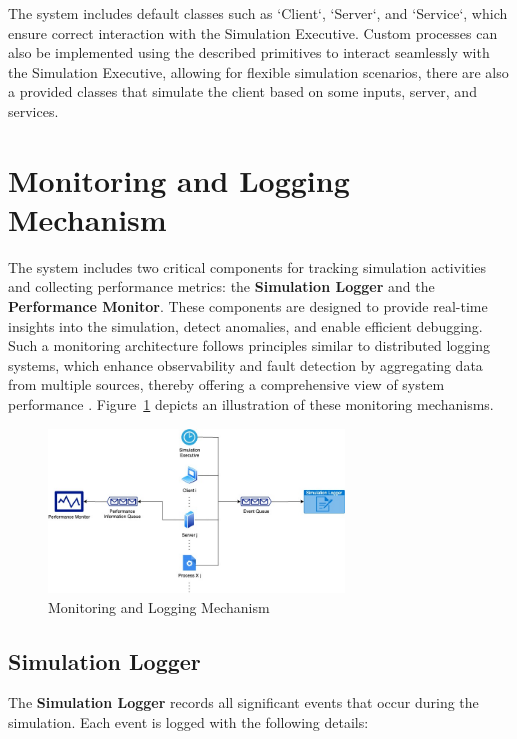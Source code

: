 The system includes default classes such as `Client`, `Server`, and `Service`, which ensure correct interaction with the Simulation Executive. Custom processes can also be implemented using the described primitives to interact seamlessly with the Simulation Executive, allowing for flexible simulation scenarios, there are also a provided classes that simulate the client based on some inputs, server, and services.


\section{Monitoring and Logging Mechanism}

The system includes two critical components for tracking simulation activities and collecting performance metrics: the \textbf{Simulation Logger} and the \textbf{Performance Monitor}. These components are designed to provide real-time insights into the simulation, detect anomalies, and enable efficient debugging. Such a monitoring architecture follows principles similar to distributed logging systems, which enhance observability and fault detection by aggregating data from multiple sources, thereby offering a comprehensive view of system performance \cite{MediumDistributedLogging}. Figure~\ref{fig:monitors} depicts an illustration of these monitoring mechanisms.

\begin{figure}[H]
    \centering
    \includegraphics[width=0.7\textwidth]{images/monitors.jpg}
    \caption{Monitoring and Logging Mechanism}
    \label{fig:monitors}
\end{figure}

\subsection{Simulation Logger}

The \textbf{Simulation Logger} records all significant events that occur during the simulation. Each event is logged with the following details:

